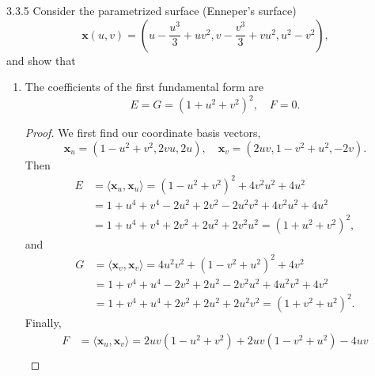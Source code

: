 \documentclass[11pt]{article}
\begin{document}
\begin{problem}{3.3.5}
  Consider the parametrized surface (Enneper's surface)
  \begin{equation}
  \label{eq:4}
  \mathbf{x}(u,v) = (u - \frac{u^3}{3} + uv^2, v - \frac{v^3}{3} + vu^2, u^2 - v^2),
\end{equation}
and show that
\begin{enumerate}[label=(\alph*)]
  \item The coefficients of the first fundamental form are
        \begin{equation}
        \label{eq:5}
        E = G = (1 + u^2 + v^2)^2, \quad F = 0.
      \end{equation}
        \begin{proof}
          We first find our coordinate basis vectors,
          \begin{equation}
          \label{eq:8}
          \mathbf{x}_u = \left( 1 - u^2 + v^2, 2vu, 2u \right), \quad \mathbf{x}_v = \left( 2uv, 1 - v^2 + u^2, -2v \right).
        \end{equation}
        Then
        \begin{equation}
          \begin{aligned}
            E &= \langle \mathbf{x}_u, \mathbf{x}_u \rangle = (1-u^2 + v^2)^2 + 4v^2 u^2 + 4 u^2 \\
              &= 1 + u^4 + v^4 - 2u^2 + 2v^2 -2u^2 v^2 + 4 v^2 u^2 + 4 u^2 \\
            &= 1 + u^4 + v^4 + 2 v^2 + 2 u^2 + 2 v^2 u^2 = (1 + u^2 + v^2)^2,
          \end{aligned}
        \end{equation}
        and
        \begin{equation}
        \label{eq:11}
        \begin{aligned}
          G &= \langle \mathbf{x}_v, \mathbf{x}_v \rangle = 4 u^2 v^2 + (1 - v^2 + u^2)^2 + 4 v^2 \\
            &= 1 + v^4 + u^4 -2v^2 + 2 u^2 - 2 v^2 u^2 + 4 u^2 v^2 + 4 v^2 \\
          &= 1 + v^4 + u^4 + 2 v^2 + 2 u^2 + 2 u^2 v^2 = (1 + v^2 + u^2)^2.
        \end{aligned}
      \end{equation}
      Finally,
      \begin{equation}
      \label{eq:18}
      \begin{aligned}
        F &= \langle \mathbf{x}_u, \mathbf{x}_v \rangle = 2uv(1- u^2 + v^2) + 2uv( 1 - v^2 + u^2) - 4 u v \\

\end{aligned}
\end{equation}
\end{proof}
\end{enumerate}
\end{problem}
\end{document}
